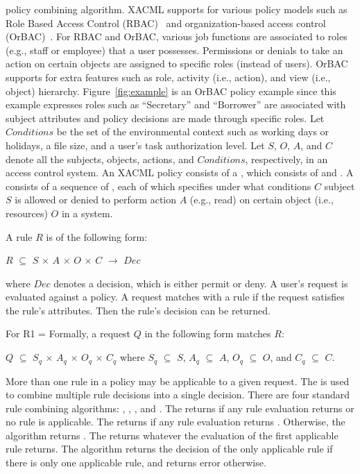 policy combining algorithm.
XACML supports for various policy models such as Role Based Access Control (RBAC)~\cite{anderson04:rbacxacml,ferraiolo01:proposed} and organization-based access control (OrBAC)~\cite{kalam03:orBac}. For RBAC and OrBAC, various job functions are associated to roles (e.g., staff or employee) that a user possesses. Permissions or denials to take an action on certain objects are assigned to specific roles (instead of users). OrBAC supports for 
extra features such as role, activity (i.e., action), and view (i.e., object) hierarchy. Figure~\ref{fig:example} is an OrBAC policy example since this example expresses roles such as ``Secretary'' and ``Borrower'' are associated with subject attributes and policy decisions are made through specific roles.
Let $Conditions$ be the set of the environmental context
such as working days or holidays, a file size, and a user's task authorization level. 
Let $S$, $O$, $A$, and $C$ denote all the subjects,
objects, actions, and  $Conditions$, respectively, in an access control system.
An XACML policy consists of a , which consists
of  and . A  consists
of a sequence of , each of which
specifies under what conditions $C$ subject $S$ is allowed or denied
to perform action $A$ (e.g., read) on certain object (i.e., resources) $O$ in a system.

A rule $R$ is of the following form:
\begin{center}
$R$ $\subseteq$ $S$ $\times$ $A$ $\times$ $O$ $\times$ $C$ $\longrightarrow$ $Dec$
\end{center}
where $Dec$ denotes a decision, which is either permit or deny.
A user's request is evaluated against a policy.
A request matches with a rule if the request satisfies the rule's
attributes. Then the rule's decision can be returned.

For R1 = 
Formally, a request $Q$ in the following form matches $R$:
\begin{center}
$Q$ $\subseteq$ $S_q$ $\times$ $A_q$ $\times$ $O_q$ $\times$ $C_q$ where $S_q$ $\subseteq$ $S$, $A_q$ $\subseteq$ $A$, $O_q$ $\subseteq$ $O$, and $C_q$ $\subseteq$ $C$.
\end{center}


More than one rule in a policy may be applicable to a given request.
The  is used to combine multiple
rule decisions into a single decision. There are four standard rule
combining algorithms: , , , and . The
 returns  if any rule
evaluation returns  or no rule is applicable. The
 returns  if any
rule evaluation returns . Otherwise, the algorithm
returns .
The  returns whatever the
evaluation of the first applicable rule returns. The
 algorithm returns the decision of the only
applicable rule if there is only one applicable rule, and returns
error otherwise.

